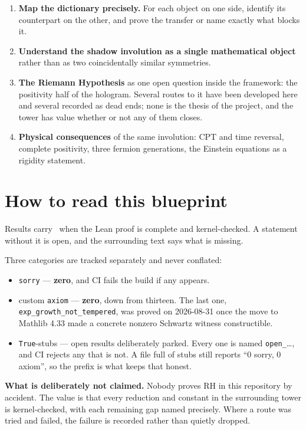 \documentclass{report}
\theoremstyle{definition}
\begin{document}
\begin{enumerate}
  \item \textbf{Map the dictionary precisely.} For each object on one side, identify its
    counterpart on the other, and prove the transfer or name exactly what blocks it.
  \item \textbf{Understand the shadow involution as a single mathematical object} rather
    than as two coincidentally similar symmetries.
  \item \textbf{The Riemann Hypothesis} as one open question inside the framework: the
    positivity half of the hologram. Several routes to it have been developed here and
    several recorded as dead ends; none is the thesis of the project, and the tower has
    value whether or not any of them closes.
  \item \textbf{Physical consequences} of the same involution: CPT and time reversal,
    complete positivity, three fermion generations, the Einstein equations as a rigidity
    statement.
\end{enumerate}

\section{How to read this blueprint}

Results carry \leanok\ when the Lean proof is complete and kernel-checked. A statement
without it is open, and the surrounding text says what is missing.

Three categories are tracked separately and never conflated:
\begin{itemize}
  \item \texttt{sorry} --- \textbf{zero}, and CI fails the build if any appears.
  \item custom \texttt{axiom} --- \textbf{zero}, down from thirteen. The last one,
    \texttt{exp\_growth\_not\_tempered}, was proved on 2026-08-31 once the move to
    Mathlib 4.33 made a concrete nonzero Schwartz witness constructible.
  \item \texttt{True}-stubs --- open results deliberately parked. Every one is named
    \texttt{open\_}\ldots, and CI rejects any that is not. A file full of stubs still
    reports ``0 sorry, 0 axiom'', so the prefix is what keeps that honest.
\end{itemize}

\textbf{What is deliberately not claimed.} Nobody proves RH in this repository by
accident. The value is that every reduction and constant in the surrounding tower is
kernel-checked, with each remaining gap named precisely. Where a route was tried and
failed, the failure is recorded rather than quietly dropped.
\end{document}
